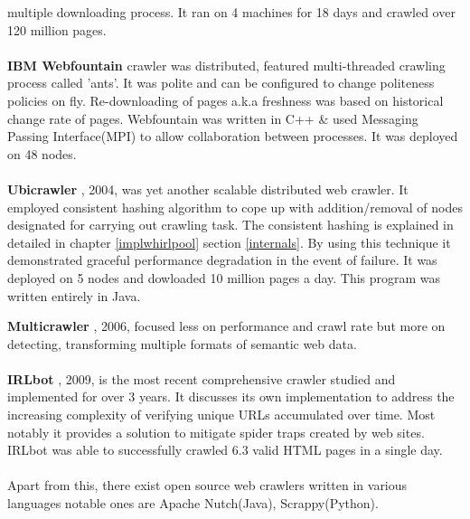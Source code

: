 multiple downloading process. It ran on 4 machines for 18 days and crawled over 120 million pages.
\\
\\
\textbf{IBM Webfountain} crawler was distributed, featured multi-threaded crawling process called 'ants'.
It was polite and can be configured to change politeness policies on fly. Re-downloading of pages a.k.a
freshness was based on historical change rate of pages. Webfountain was written in C++ \& used Messaging
Passing Interface(MPI) to allow collaboration between processes. It was deployed on 48 nodes.
\\
\\
\textbf{Ubicrawler} \cite{ubicrawler}, 2004, was yet another scalable distributed web crawler. It employed
consistent hashing algorithm to cope up with addition/removal of nodes designated for carrying out crawling
task. The consistent hashing is explained in detailed in chapter \ref{implwhirlpool} section \ref{internals}. By using this technique it demonstrated graceful performance degradation in the event of failure. It was
deployed on 5 nodes and dowloaded 10 million pages a day. This program was written entirely in Java.
\\
\pagebreak

\textbf{Multicrawler} \cite{multicrawler}, 2006, focused less on performance and crawl rate but more on
detecting, transforming multiple formats of semantic web data.
\\
\\
\textbf{IRLbot} \cite{irlbot}, 2009, is the most recent comprehensive crawler studied and implemented for
over 3 years. It discusses its own implementation to address the increasing complexity of verifying unique
URLs accumulated over time. Most notably it provides a solution to mitigate spider traps created by web sites. IRLbot was able to successfully crawled 6.3 valid HTML pages in a single day.
\\
\\
Apart from this, there exist open source web crawlers written in various languages notable ones are Apache Nutch(Java), Scrappy(Python).

